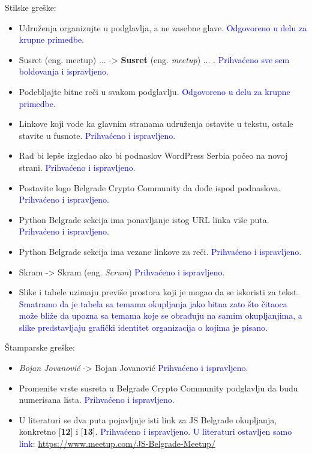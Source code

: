 \documentclass[a4paper]{report}
\newcommand{\odgovor}[1]{\textcolor{blue}{#1}}
\begin{document}
Stilske greške:\begin{itemize}
\item Udruženja organizujte u podglavlja, a ne zasebne glave.
\odgovor{Odgovoreno u delu za krupne primedbe.}
\item Susret (eng. meetup) ... -> \textbf{Susret} (eng. \textit{meetup}) ... .
\odgovor{Prihvaćeno sve sem boldovanja i ispravljeno.}
\item Podebljajte bitne reči u svakom podglavlju.
\odgovor{Odgovoreno u delu za krupne primedbe.}
\item Linkove koji vode ka glavnim stranama udruženja ostavite u tekstu, ostale stavite u fusnote.
\odgovor{Prihvaćeno i ispravljeno.}
\item Rad bi lepše izgledao ako bi podnaslov WordPress Serbia počeo na novoj strani.
\odgovor{Prihvaćeno i ispravljeno.}
\item Postavite logo Belgrade Crypto Community da dođe ispod podnaslova.
\odgovor{Prihvaćeno i ispravljeno.}
\item Python Belgrade sekcija ima ponavljanje istog URL linka više puta.
\odgovor{Prihvaćeno i ispravljeno.}
\item Python Belgrade sekcija ima vezane linkove za reči.
\odgovor{Prihvaćeno i ispravljeno.}
\item Skram -> Skram (eng. \textit{Scrum})
\odgovor{Prihvaćeno i ispravljeno.}
\item Slike i tabele uzimaju previše prostora koji je mogao da se iskoristi za tekst.
\odgovor{Smatramo da je tabela sa temama okupljanja jako bitna zato što čitaoca može bliže da upozna sa temama koje se obrađuju na samim okupljanjima, a slike predstavljaju grafički identitet organizacija o kojima je pisano.}

\end{itemize}

Štamparske greške:\begin{itemize}
\item \textit{Bojan Jovanović} -> Bojan Jovanović
\odgovor{Prihvaćeno i ispravljeno.}
\item Promenite vrste susreta u Belgrade Crypto Community podglavlju da budu numerisana lista.
\odgovor{Prihvaćeno i ispravljeno.}
\item U literaturi se dva puta pojavljuje isti link za JS Belgrade okupljanja, konkretno
      [\textbf{12}] i [\textbf{13}].
\odgovor{Prihvaćeno i ispravljeno. U literaturi ostavljen samo link: \url{https://www.meetup.com/JS-Belgrade-Meetup/}}
\end{itemize}
\end{document}

